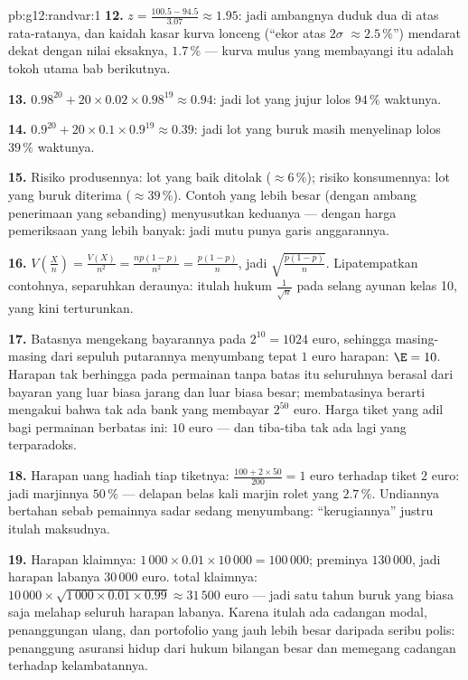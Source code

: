\begin{solution}{pb:g12:randvar:1}
\textbf{12.} $z = \frac{100.5 - 94.5}{3.07} \approx 1.95$:
jadi ambangnya duduk dua  di atas rata-ratanya,
dan kaidah kasar kurva lonceng (``ekor atas $2\sigma$
$\approx 2.5\,\%$'') mendarat dekat dengan nilai eksaknya, $1.7\,\%$ ---
kurva mulus yang membayangi  itu adalah tokoh utama
bab berikutnya.

\textbf{13.} $0.98^{20} + 20 \times 0.02 \times 0.98^{19}
\approx 0.94$: jadi lot yang jujur lolos $94\,\%$ waktunya.

\textbf{14.} $0.9^{20} + 20 \times 0.1 \times 0.9^{19}
\approx 0.39$: jadi lot yang buruk masih menyelinap lolos $39\,\%$
waktunya.

\textbf{15.} Risiko produsennya: lot yang baik ditolak
($\approx 6\,\%$); risiko konsumennya: lot yang buruk diterima
($\approx 39\,\%$). Contoh yang lebih besar (dengan ambang
penerimaan yang sebanding) menyusutkan keduanya --- dengan harga pemeriksaan
yang lebih banyak: jadi mutu punya garis anggarannya.

\textbf{16.} $V\!\left(\frac Xn\right) = \frac{V(X)}{n^2} =
\frac{np(1-p)}{n^2} = \frac{p(1-p)}{n}$, jadi 
$\sqrt{\frac{p(1-p)}{n}}$. Lipatempatkan contohnya, separuhkan
deraunya: itulah hukum $\frac{1}{\sqrt n}$ pada selang ayunan
kelas 10, yang kini terturunkan.

\textbf{17.} Batasnya mengekang bayarannya pada $2^{10} = 1024$
euro, sehingga masing-masing dari sepuluh putarannya menyumbang tepat $1$ euro
harapan: $\E = 10$. Harapan tak berhingga pada permainan tanpa batas itu
seluruhnya berasal dari bayaran yang luar biasa jarang dan
luar biasa besar; membatasinya berarti mengakui bahwa tak ada bank
yang membayar $2^{50}$ euro. Harga tiket yang adil bagi permainan berbatas ini:
$10$ euro --- dan tiba-tiba tak ada lagi yang terparadoks.

\textbf{18.} Harapan uang hadiah tiap tiketnya:
$\frac{100 + 2 \times 50}{200} = 1$ euro terhadap tiket
$2$ euro: jadi marjinnya $50\,\%$ --- delapan belas kali marjin rolet yang
$2.7\,\%$. Undiannya bertahan sebab pemainnya
sadar sedang menyumbang: ``kerugiannya'' justru itulah maksudnya.

\textbf{19.} Harapan klaimnya: $1\,000 \times 0.01 \times
10\,000 = 100\,000$; preminya $130\,000$, jadi harapan labanya
$30\,000$ euro.  total klaimnya:
$10\,000 \times \sqrt{1\,000 \times 0.01 \times 0.99}
\approx 31\,500$ euro --- jadi satu tahun buruk yang biasa saja melahap
seluruh harapan labanya. Karena itulah ada cadangan modal, penanggungan ulang,
dan portofolio yang jauh lebih besar daripada seribu polis: penanggung asuransi
hidup dari hukum bilangan besar dan memegang cadangan terhadap
kelambatannya.


\end{solution}

